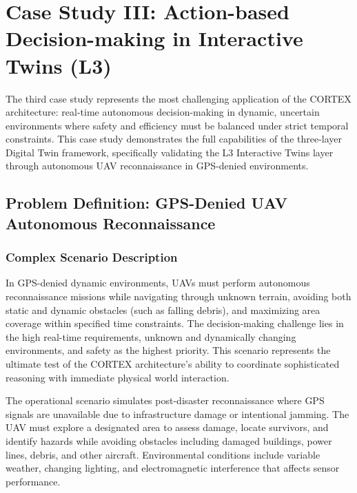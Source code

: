 
\chapter{Case Study III: Action-based Decision-making in Interactive Twins (L3)} \label{chp:uav}


The third case study represents the most challenging application of the CORTEX architecture: real-time autonomous decision-making in dynamic, uncertain environments where safety and efficiency must be balanced under strict temporal constraints. This case study demonstrates the full capabilities of the three-layer Digital Twin framework, specifically validating the L3 Interactive Twins layer through autonomous UAV reconnaissance in GPS-denied environments.

\section{Problem Definition: GPS-Denied UAV Autonomous Reconnaissance}

\subsection{Complex Scenario Description}

In GPS-denied dynamic environments, UAVs must perform autonomous reconnaissance missions while navigating through unknown terrain, avoiding both static and dynamic obstacles (such as falling debris), and maximizing area coverage within specified time constraints. The decision-making challenge lies in the high real-time requirements, unknown and dynamically changing environments, and safety as the highest priority. This scenario represents the ultimate test of the CORTEX architecture's ability to coordinate sophisticated reasoning with immediate physical world interaction.

The operational scenario simulates post-disaster reconnaissance where GPS signals are unavailable due to infrastructure damage or intentional jamming. The UAV must explore a designated area to assess damage, locate survivors, and identify hazards while avoiding obstacles including damaged buildings, power lines, debris, and other aircraft. Environmental conditions include variable weather, changing lighting, and electromagnetic interference that affects sensor performance.

